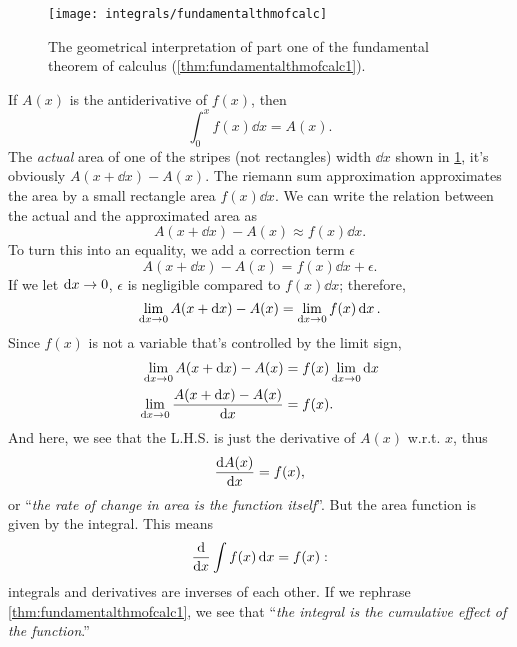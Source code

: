\begin{figure}[b]
    \centering
    \texttt{[image: integrals/fundamentalthmofcalc]}
    \caption{The geometrical interpretation of part one of the fundamental theorem of calculus (\cref{thm:fundamentalthmofcalc1}).}
    \label{fig:fundamentalthmofcalc}
\end{figure}
If $A(x)$ is the antiderivative of $f(x)$, then
\begin{equation}
    \int_{0}^{x} f(x)\dd{x} = A(x).
\end{equation}
The \emph{actual} area of one of the stripes (not rectangles) width $\dd{x}$ shown in \cref{fig:fundamentalthmofcalc}, it's obviously $A(x + \dd{x}) - A(x)$. The riemann sum approximation approximates the area by a small rectangle area $f(x)\dd{x}$. We can write the relation between the actual and the approximated area as
\begin{equation}
    A(x + \dd{x}) - A(x) \approx f(x)\dd{x}.
\end{equation}
To turn this into an equality, we add a correction term $\epsilon$
\begin{equation}
    A(x + \dd{x}) - A(x) = f(x)\dd{x} + \epsilon.
\end{equation}
If we let $\dd{x} \rightarrow 0$, $\epsilon$ is negligible compared to $f(x)\dd{x}$; therefore,
\begin{equation}
    \lim_{\dd{x} \rightarrow 0}A(x + \dd{x}) - A(x) = \lim_{\dd{x} \rightarrow 0}f(x)\dd{x}.
\end{equation}
Since $f(x)$ is not a variable that's controlled by the limit sign,
\begin{align*}
    \lim_{\dd{x} \rightarrow 0}A(x + \dd{x}) - A(x) &= f(x)\lim_{\dd{x} \rightarrow 0}\dd{x} \\
    \lim_{\dd{x} \rightarrow 0}\frac{A(x + \dd{x}) - A(x)}{\dd{x}} &= f(x).
\end{align*}
And here, we see that the L.H.S. is just the derivative of $A(x)$ w.r.t. $x$, thus
\begin{equation}
    \dv{A(x)}{x} = f(x),
\end{equation}
or ``\textit{the rate of change in area is the function itself}''. But the area function is given by the integral. This means
\begin{equation}
    \dv{x}\int f(x)\dd{x} = f(x):
\end{equation}
integrals and derivatives are inverses of each other. If we rephrase \cref{thm:fundamentalthmofcalc1}, we see that ``\textit{the integral is the cumulative effect of the function}.''

